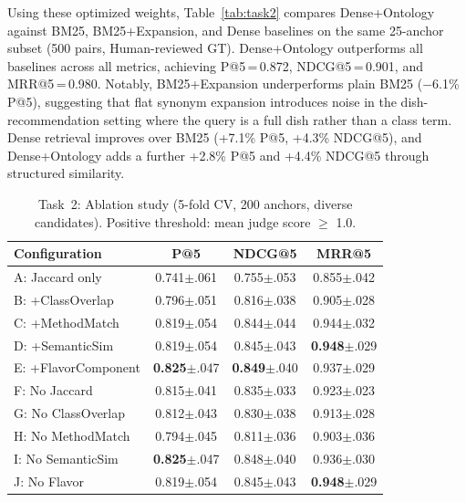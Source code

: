 Using these optimized weights, Table~\ref{tab:task2} compares Dense+Ontology against BM25, BM25+Expansion, and Dense baselines on the same 25-anchor subset (500 pairs, Human-reviewed GT). Dense+Ontology outperforms all baselines across all metrics, achieving P@5\,=\,0.872, NDCG@5\,=\,0.901, and MRR@5\,=\,0.980. Notably, BM25+Expansion underperforms plain BM25 ($-$6.1\% P@5), suggesting that flat synonym expansion introduces noise in the dish-recommendation setting where the query is a full dish rather than a class term. Dense retrieval improves over BM25 (+7.1\% P@5, +4.3\% NDCG@5), and Dense+Ontology adds a further +2.8\% P@5 and +4.4\% NDCG@5 through structured similarity.

\begin{table}[t]
\centering
\caption{Task~2: Ablation study (5-fold CV, 200 anchors, diverse candidates). Positive threshold: mean judge score $\geq$ 1.0.}
\label{tab:task2_ablation}
\small
\begin{tabular}{lccc}
\toprule
\textbf{Configuration} & \textbf{P@5} & \textbf{NDCG@5} & \textbf{MRR@5} \\
\midrule
A: Jaccard only              & 0.741{\scriptsize$\pm$.061} & 0.755{\scriptsize$\pm$.053} & 0.855{\scriptsize$\pm$.042} \\
B: +ClassOverlap             & 0.796{\scriptsize$\pm$.051} & 0.816{\scriptsize$\pm$.038} & 0.905{\scriptsize$\pm$.028} \\
C: +MethodMatch              & 0.819{\scriptsize$\pm$.054} & 0.844{\scriptsize$\pm$.044} & 0.944{\scriptsize$\pm$.032} \\
D: +SemanticSim              & 0.819{\scriptsize$\pm$.054} & 0.845{\scriptsize$\pm$.043} & \textbf{0.948}{\scriptsize$\pm$.029} \\
E: +FlavorComponent          & \textbf{0.825}{\scriptsize$\pm$.047} & \textbf{0.849}{\scriptsize$\pm$.040} & 0.937{\scriptsize$\pm$.029} \\
\midrule
F: No Jaccard                & 0.815{\scriptsize$\pm$.041} & 0.835{\scriptsize$\pm$.033} & 0.923{\scriptsize$\pm$.023} \\
G: No ClassOverlap           & 0.812{\scriptsize$\pm$.043} & 0.830{\scriptsize$\pm$.038} & 0.913{\scriptsize$\pm$.028} \\
H: No MethodMatch            & 0.794{\scriptsize$\pm$.045} & 0.811{\scriptsize$\pm$.036} & 0.903{\scriptsize$\pm$.036} \\
I: No SemanticSim            & \textbf{0.825}{\scriptsize$\pm$.047} & 0.848{\scriptsize$\pm$.040} & 0.936{\scriptsize$\pm$.030} \\
J: No Flavor                 & 0.819{\scriptsize$\pm$.054} & 0.845{\scriptsize$\pm$.043} & \textbf{0.948}{\scriptsize$\pm$.029} \\
\bottomrule
\end{tabular}
\end{table}

